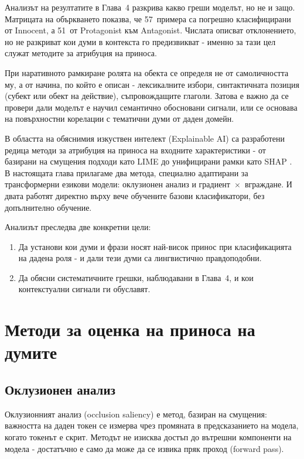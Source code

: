 \documentclass[12pt,a4paper]{report}
\begin{document}
Анализът на резултатите в Глава~4 разкрива какво греши моделът, но не и защо. Матрицата на объркването показва, че 57~примера са погрешно класифицирани от Innocent, а 51~от Protagonist към Antagonist. Числата описват отклонението, но не разкриват кои думи в контекста го предизвикват - именно за тази цел служат методите за атрибуция на приноса.

При наративното рамкиране ролята на обекта се определя не от самоличността му, а от начина, по който е описан - лексикалните избори, синтактичната позиция (субект или обект на действие), съпровождащите глаголи. Затова е важно да се провери дали моделът е научил семантично обосновани сигнали, или се основава на повърхностни корелации с тематични думи от даден домейн.

В областта на обяснимия изкуствен интелект (Explainable AI) са разработени редица методи за атрибуция на приноса на входните характеристики - от базирани на смущения подходи като LIME \cite{ribeiro2016lime} до унифицирани рамки като SHAP \cite{lundberg2017shap}. В настоящата глава прилагаме два метода, специално адаптирани за трансформерни езикови модели: оклузионен анализ и градиент~$\times$~вграждане. И двата работят директно върху вече обучените базови класификатори, без допълнително обучение.

Анализът преследва две конкретни цели:
\begin{enumerate}
  \item Да установи кои думи и фрази носят най-висок принос при класификацията на дадена роля - и дали тези думи са лингвистично правдоподобни.
  \item Да обясни систематичните грешки, наблюдавани в Глава~4, и кои контекстуални сигнали ги обуславят.
\end{enumerate}


\section{Методи за оценка на приноса на думите}

\subsection{Оклузионен анализ}

Оклузионният анализ (occlusion saliency) е метод, базиран на смущения: важността на даден токен се измерва чрез промяната в предсказанието на модела, когато токенът е скрит. Методът не изисква достъп до вътрешни компоненти на модела - достатъчно е само да може да се извика пряк проход (forward pass).
\end{document}
